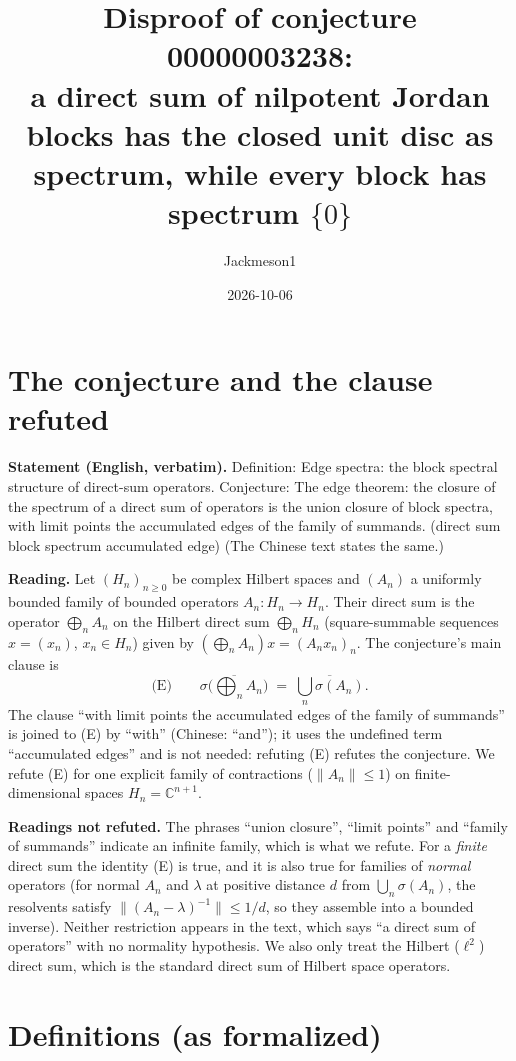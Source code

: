 \documentclass[11pt]{article}
\title{Disproof of conjecture 00000003238:\\ a direct sum of nilpotent Jordan blocks has the closed
unit disc as spectrum, while every block has spectrum $\{0\}$}
\author{Jackmeson1}
\date{2026-10-06}
\theoremstyle{definition}
\begin{document}
\maketitle

\section{The conjecture and the clause refuted}

\textbf{Statement (English, verbatim).} Definition: Edge spectra: the block spectral structure of
direct-sum operators. Conjecture: The edge theorem: the closure of the spectrum of a direct sum of
operators is the union closure of block spectra, with limit points the accumulated edges of the
family of summands. (direct sum block spectrum accumulated edge) (The Chinese text states the
same.)

\textbf{Reading.} Let $(H_n)_{n\ge 0}$ be complex Hilbert spaces and $(A_n)$ a uniformly bounded
family of bounded operators $A_n:H_n\to H_n$. Their direct sum is the operator
$\bigoplus_n A_n$ on the Hilbert direct sum $\bigoplus_n H_n$ (square-summable sequences
$x=(x_n)$, $x_n\in H_n$) given by $(\bigoplus_n A_n)x=(A_nx_n)_n$. The conjecture's main clause is
\[
  \text{(E)}\qquad \overline{\sigma\Big(\bigoplus_n A_n\Big)}
     \;=\;\overline{\bigcup_n \sigma(A_n)} .
\]
The clause ``with limit points the accumulated edges of the family of summands'' is joined to (E)
by ``with'' (Chinese: ``and''); it uses the undefined term ``accumulated edges'' and is not needed:
refuting (E) refutes the conjecture. We refute (E) for one explicit family of contractions
($\|A_n\|\le 1$) on finite-dimensional spaces $H_n=\mathbb{C}^{n+1}$.

\textbf{Readings not refuted.} The phrases ``union closure'', ``limit points'' and ``family of
summands'' indicate an infinite family, which is what we refute. For a \emph{finite} direct sum
the identity (E) is true, and it is also true for families of \emph{normal} operators (for normal
$A_n$ and $\lambda$ at positive distance $d$ from $\bigcup_n\sigma(A_n)$, the resolvents satisfy
$\|(A_n-\lambda)^{-1}\|\le 1/d$, so they assemble into a bounded inverse). Neither restriction
appears in the text, which says ``a direct sum of operators'' with no normality hypothesis. We
also only treat the Hilbert ($\ell^2$) direct sum, which is the standard direct sum of Hilbert
space operators.

\section{Definitions (as formalized)}
\end{document}

